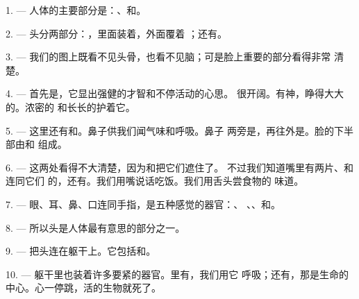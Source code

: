 
\VUsaut{4.0mm}
\VUsaut{2.0mm}

\VUsaut{2.4mm}
\VUsaut{3.0mm}

1. --- 人体的主要部分是：、和。

\VUsaut{3.0mm}

2. --- 头分两部分：，里面装着，外面覆着
；还有。

3. --- 我们的图上既看不见头骨，也看不见脑；可是脸上重要的部分看得非常
清楚。

4. --- 首先是，它显出强健的才智和不停活动的心思。
很开阔。有神，睁得大大的。浓密的
和长长的护着它。

5. --- 这里还有和。鼻子供我们闻气味和呼吸。鼻子
两旁是，再往外是。脸的下半部由和
组成。

6. --- 这两处看得不大清楚，因为和把它们遮住了。
不过我们知道嘴里有两片、和连同它们
的，还有。我们用嘴说话吃饭。我们用舌头尝食物的
味道。

7. --- 眼、耳、鼻、口连同手指，是五种感觉的器官：、
、、和。

8. --- 所以头是人体最有意思的部分之一。

\VUsaut{4.4mm}
\VUsaut{3.0mm}

9. --- 把头连在躯干上。它包括和。

10. --- 躯干里也装着许多要紧的器官。里有，我们用它
呼吸；还有，那是生命的中心。心一停跳，活的生物就死了。

